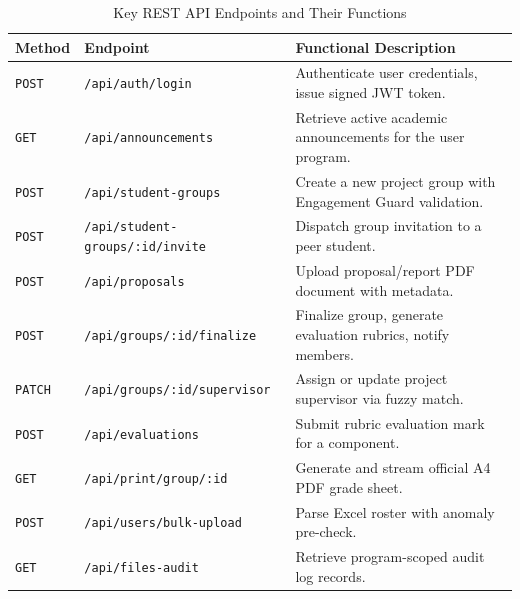 \begin{table}[H]
\centering
\small
\caption{Key REST API Endpoints and Their Functions}
\label{tab:api_routes}
\vspace{6pt}
\begin{tabularx}{\textwidth}{|l|l|X|}
\hline
\textbf{Method} & \textbf{Endpoint} & \textbf{Functional Description} \\
\hline
\texttt{POST} & \texttt{/api/auth/login} & Authenticate user credentials, issue signed JWT token. \\
\texttt{GET} & \texttt{/api/announcements} & Retrieve active academic announcements for the user program. \\
\texttt{POST} & \texttt{/api/student-groups} & Create a new project group with Engagement Guard validation. \\
\texttt{POST} & \texttt{/api/student-groups/:id/invite} & Dispatch group invitation to a peer student. \\
\texttt{POST} & \texttt{/api/proposals} & Upload proposal/report PDF document with metadata. \\
\texttt{POST} & \texttt{/api/groups/:id/finalize} & Finalize group, generate evaluation rubrics, notify members. \\
\texttt{PATCH} & \texttt{/api/groups/:id/supervisor} & Assign or update project supervisor via fuzzy match. \\
\texttt{POST} & \texttt{/api/evaluations} & Submit rubric evaluation mark for a component. \\
\texttt{GET} & \texttt{/api/print/group/:id} & Generate and stream official A4 PDF grade sheet. \\
\texttt{POST} & \texttt{/api/users/bulk-upload} & Parse Excel roster with anomaly pre-check. \\
\texttt{GET} & \texttt{/api/files-audit} & Retrieve program-scoped audit log records. \\
\hline
\end{tabularx}
\end{table}
